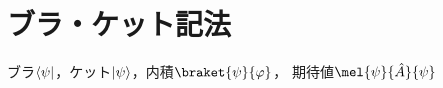 \documentclass[../sotsu.tex]{subfiles}
\begin{document}
\section{ブラ・ケット記法}



ブラ$\langle\psi\rvert$，ケット$\lvert\psi\rangle$，内積$\braket{\psi}{\varphi}$，
期待値$\mel{\psi}{\hat{A}}{\psi}$
\end{document}
